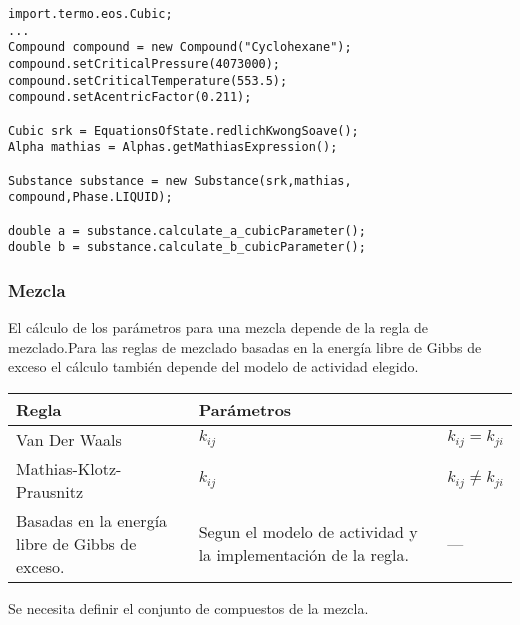 \begin{lstlisting}[caption=Cálculo de los parámetros de la ecuación de estado Soave Redlich Kwong y la expresión de $\alpha$ de mathias para el compuesto ]
import.termo.eos.Cubic;
...
Compound compound = new Compound("Cyclohexane");
compound.setCriticalPressure(4073000);
compound.setCriticalTemperature(553.5);
compound.setAcentricFactor(0.211);

Cubic srk = EquationsOfState.redlichKwongSoave();
Alpha mathias = Alphas.getMathiasExpression();

Substance substance = new Substance(srk,mathias, compound,Phase.LIQUID);

double a = substance.calculate_a_cubicParameter();
double b = substance.calculate_b_cubicParameter();
\end{lstlisting}





\subsubsection{Mezcla}

El cálculo de los parámetros para una mezcla depende de la regla de mezclado.Para las reglas de mezclado basadas en la energía libre de Gibbs de exceso el cálculo también depende del modelo de actividad elegido.

\begin{tabularx}{\textwidth}{|X|X|X|}
	\hline
	Regla & Parámetros & \\
	\hline
	Van Der Waals & $k_{ij}$ & $k_{ij} = k_{ji}$ \\
	Mathias-Klotz-Prausnitz& $k_{ij}$ & $k_{ij} \neq k_{ji}$ \\
	Basadas en la energía libre de Gibbs de exceso. & Segun el modelo de actividad y la implementación de la regla.& --- \\
	\hline
\end{tabularx}

Se necesita definir el conjunto de compuestos de la mezcla.

